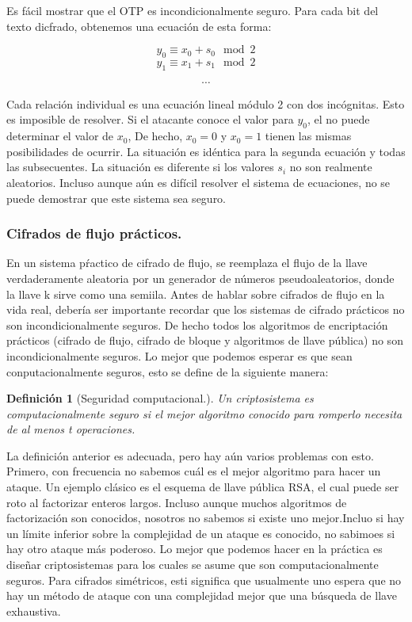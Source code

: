 \documentclass{llncs}
\theoremstyle{plane}
\newtheorem{defi}{Definición}
\begin{document}
Es fácil mostrar que el OTP es incondicionalmente seguro. Para cada bit del texto dicfrado, obtenemos una ecuación de esta forma:

\[y_{0} \equiv x_{0}+ s_{0} \mod{2} \]
\[y_{1} \equiv x_{1}+ s_{1} \mod{2} \]

\[ \cdots \]

Cada relación individual es una ecuación lineal módulo 2 con dos incógnitas. Esto es imposible de resolver. Si el atacante conoce el valor para $y_{0}$, el no puede determinar el valor de $x_{0}$, De hecho, $x_{0}=0$ y $x_{0}=1$ tienen las mismas posibilidades de ocurrir. La situación es idéntica para la segunda ecuación y todas las subsecuentes. La situación es diferente si los valores $s_{i}$ no son realmente aleatorios. Incluso aunque aún es difícil resolver el sistema de ecuaciones, no se puede demostrar que este sistema sea seguro.

\subsubsection{Cifrados de flujo prácticos.}
En un sistema pŕactico de cifrado de flujo, se reemplaza el flujo de la llave verdaderamente aleatoria por un generador de números pseudoaleatorios, donde la llave k sirve como una semiila. Antes de hablar sobre cifrados de flujo en la vida real, debería ser importante recordar que los sistemas de cifrado prácticos no son incondicionalmente seguros. De hecho todos los algoritmos de encriptación prácticos (cifrado de flujo, cifrado de bloque y algoritmos de llave pública) no son incondicionalmente seguros. Lo mejor que podemos esperar es que sean conputacionalmente seguros, esto se define de la siguiente manera:

\begin{defi}[Seguridad computacional.]
Un criptosistema es computacionalmente seguro si el mejor algoritmo conocido para romperlo necesita de al menos t operaciones.
\end{defi}

La definición anterior es adecuada, pero hay aún varios problemas con esto. Primero, con frecuencia no sabemos cuál es el mejor algoritmo para hacer un ataque. Un ejemplo clásico es el esquema de llave pública RSA, el cual puede ser roto al factorizar enteros largos. Incluso aunque muchos algoritmos de factorización son conocidos, nosotros no sabemos si existe uno mejor.Incluo si hay un límite inferior sobre la complejidad de un ataque es conocido, no sabimoes si hay otro ataque más poderoso. Lo mejor que podemos hacer en la práctica es diseñar criptosistemas  para los cuales se asume que son computacionalmente seguros. Para cifrados simétricos, esti significa que usualmente uno espera que no hay un método de ataque con una complejidad mejor que una búsqueda de llave exhaustiva.
\end{document}
